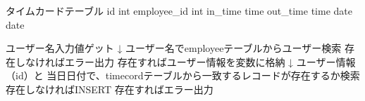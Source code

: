 タイムカードテーブル
id int
employee_id int
in_time time
out_time time
date date

ユーザー名入力値ゲット
↓
ユーザー名でemployeeテーブルからユーザー検索
存在しなければエラー出力
存在すればユーザー情報を変数に格納
↓
ユーザー情報（id）と 当日日付で、timecordテーブルから一致するレコードが存在するか検索
存在しなければINSERT
存在すればエラー出力